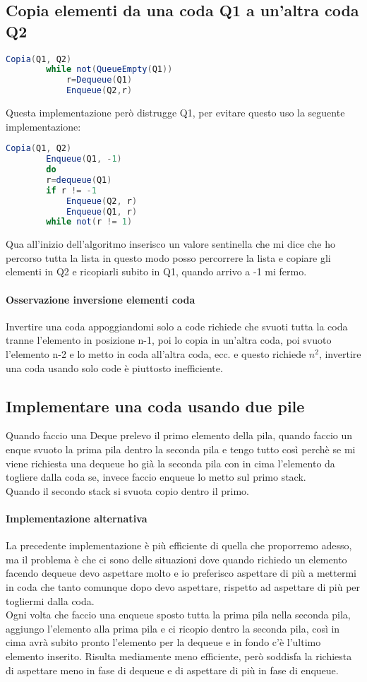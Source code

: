 \subsection{Copia elementi da una coda Q1 a un'altra coda Q2}
\begin{lstlisting}[language=Java]
    Copia(Q1, Q2)
        while not(QueueEmpty(Q1))
            r=Dequeue(Q1)
            Enqueue(Q2,r)
\end{lstlisting}
Questa implementazione però distrugge Q1, per evitare questo uso la seguente implementazione:
\begin{lstlisting}[language=Java]
    Copia(Q1, Q2)
        Enqueue(Q1, -1)
        do
        r=dequeue(Q1)
        if r != -1
            Enqueue(Q2, r)
            Enqueue(Q1, r)
        while not(r != 1)
\end{lstlisting}
Qua all'inizio dell'algoritmo inserisco un valore sentinella che mi dice che ho percorso tutta la lista 
in questo modo posso percorrere la lista e copiare gli elementi in Q2 e ricopiarli subito in Q1, quando
arrivo a -1 mi fermo.
\paragraph*{Osservazione inversione elementi coda} Invertire una coda appoggiandomi solo a code richiede che svuoti tutta la coda tranne l'elemento
in posizione n-1, poi lo copia in un'altra coda, poi svuoto l'elemento n-2 e lo metto in coda all'altra
coda, ecc. e questo richiede $n^2$, invertire una coda usando solo code è piuttosto inefficiente.\\
\subsection{Implementare una coda usando due pile}
Quando faccio una Deque prelevo il primo elemento della pila, quando faccio un enque svuoto la prima
pila dentro la seconda pila e tengo tutto così perchè se mi viene richiesta una dequeue ho già la seconda
pila con in cima l'elemento da togliere dalla coda se, invece faccio enqueue lo metto sul primo stack.\\
Quando il secondo stack si svuota copio dentro il primo.
\paragraph*{Implementazione alternativa} La precedente implementazione è più efficiente di quella
che proporremo adesso, ma il problema è che ci sono delle situazioni dove quando richiedo un elemento
facendo dequeue devo aspettare molto e io preferisco aspettare di più a mettermi in coda che tanto
comunque dopo devo aspettare, rispetto ad aspettare di più per togliermi dalla coda.\\
Ogni volta che faccio una enqueue sposto tutta la prima pila nella seconda pila, aggiungo l'elemento 
alla prima pila e ci ricopio dentro la seconda pila, così in cima avrà subito pronto l'elemento per la
dequeue e in fondo c'è l'ultimo elemento inserito. Risulta mediamente meno efficiente, però soddisfa
la richiesta di aspettare meno in fase di dequeue e di aspettare di più in fase di enqueue.
